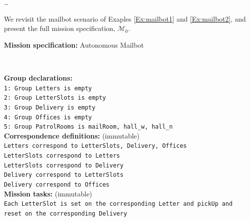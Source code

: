 \ldots

\begin{myExample}\label{Ex:mailbot3} We revisit the mailbot scenario of Exaples \ref{Ex:mailbot1} and \ref{Ex:mailbot2}, and present the full mission specification, $\mathcal{M}_0$.
\end{myExample}

\begin{algorithm}
	\textbf{Mission specification:} Autonomous Mailbot
	
	\vspace{-7 pt}
	\hrulefill\\
	{\small
	
	\textbf{Group declarations:}\\
	\texttt{1: Group Letters is empty} \\
	\texttt{2: Group LetterSlots is empty} \\
	\texttt{3: Group Delivery is empty} \\
	\texttt{4: Group Offices is empty} \\
	\texttt{5: Group PatrolRooms is mailRoom, hall\_w, hall\_n}\\ %
	
	\textbf{Correspondence definitions:} (immutable)\\ %
	\texttt{Letters correspond to LetterSlots, Delivery, Offices}\\ %
	\texttt{LetterSlots correspond to Letters}\\
	\texttt{LetterSlots correspond to Delivery}\\
	\texttt{Delivery correspond to LetterSlots}\\
	\texttt{Delivery correspond to Offices}\\
	
	
	\textbf{Mission tasks:} (immutable)\\
	\texttt{Each LetterSlot is set on the corresponding Letter and pickUp and reset on the corresponding Delivery}\\
	
}
\end{algorithm}
